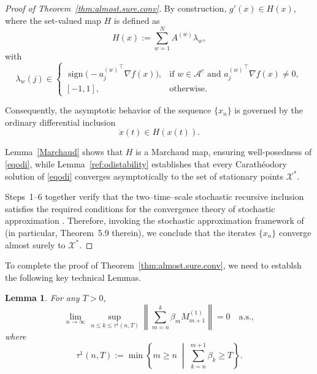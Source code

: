 \documentclass{article}
\newtheorem{lemma}[theorem]{Lemma}
\begin{document}
\begin{proof}[Proof of Theorem~\ref{thm:almost.sure.conv}]
By construction, \(g'(x)\in H(x)\), where the set-valued map \(H\) is defined as
\[
H(x)
:=
\sum_{w=1}^{N} A^{(w)} \lambda_w,
\]
with
\[
\lambda_w(j)\in
\begin{cases}
\operatorname{sign}\!\big(-{a_j^{(w)}}^\top \nabla f(x)\big),
& \text{if } w\in\mathcal{A}^c \text{ and } {a_j^{(w)}}^\top \nabla f(x)\neq 0,
\\[0.5ex]
[-1,1],
& \text{otherwise}.
\end{cases}
\]

Consequently, the asymptotic behavior of the sequence \(\{x_n\}\) is governed by the ordinary differential inclusion
\begin{equation}
\dot{x}(t)\in H(x(t)).
\label{eqodi}
\end{equation}

Lemma~\ref{Marchaud} shows that \(H\) is a Marchaud map, ensuring well-posedness of \eqref{eqodi}, while Lemma~\ref{ref:odistability} establishes that every Carath\'eodory solution of \eqref{eqodi} converges asymptotically to the  set of stationary points \(\mathcal{X}^\ast\).

Steps~1--6 together verify that the two--time--scale stochastic recursive inclusion satisfies the required conditions for the convergence theory of stochastic approximation \cite{yaji2020stochastic}. Therefore, invoking the stochastic approximation framework of~\cite{yaji2020stochastic} (in particular, Theorem~5.9 therein), we conclude that the iterates \(\{x_n\}\) converge almost surely to \(\mathcal{X}^\ast\).

\end{proof}

To complete the proof of Theorem~\ref{thm:almost.sure.conv}, we need to establsh the following key technical Lemmas.
\begin{lemma}
For any $T>0$,
\[
\lim_{n \to \infty}
\sup_{\, n \le k \le \tau^1(n,T)}
\left\|
\sum_{m=n}^{k} \beta_m M_{m+1}^{(1)}
\right\|
= 0 \quad \text{a.s.},
\]
where
\[
\tau^1(n,T)
:= \min \left\{ m \ge n \;\middle|\; \sum_{k=n}^{m+1} \beta_k \ge T \right\}.
\]
\label{Corolloary assumption on noise}
\end{lemma}
\end{document}
